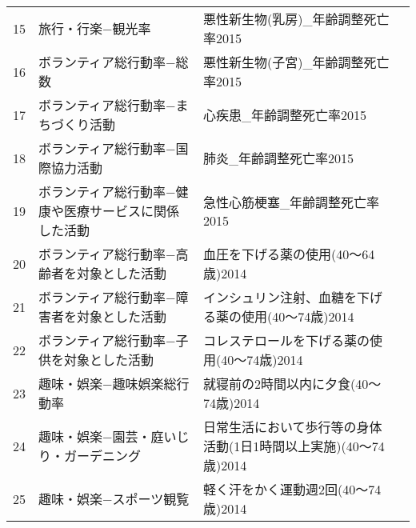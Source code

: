 \begin{table}[ht]
\begin{adjustbox}{width=1.5\textwidth}
\begin{tabular}{rlll}
  15 & 旅行・行楽−観光率 & 悪性新生物(乳房)\_年齢調整死亡率2015 &  \\
  16 & ボランティア総行動率−総数 & 悪性新生物(子宮)\_年齢調整死亡率2015 &  \\
  17 & ボランティア総行動率−まちづくり活動 & 心疾患\_年齢調整死亡率2015 &  \\
  18 & ボランティア総行動率−国際協力活動 & 肺炎\_年齢調整死亡率2015 &  \\
  19 & ボランティア総行動率−健康や医療サービスに関係した活動 & 急性心筋梗塞\_年齢調整死亡率2015 &  \\
  20 & ボランティア総行動率−高齢者を対象とした活動 & 血圧を下げる薬の使用(40〜64歳)2014 &  \\
  21 & ボランティア総行動率−障害者を対象とした活動 & インシュリン注射、血糖を下げる薬の使用(40〜74歳)2014 &  \\
  22 & ボランティア総行動率−子供を対象とした活動 & コレステロールを下げる薬の使用(40〜74歳)2014 &  \\
  23 & 趣味・娯楽−趣味娯楽総行動率 & 就寝前の2時間以内に夕食(40〜74歳)2014 &  \\
  24 & 趣味・娯楽−園芸・庭いじり・ガーデニング & 日常生活において歩行等の身体活動(1日1時間以上実施)(40〜74歳)2014 &  \\
  25 & 趣味・娯楽−スポーツ観覧 & 軽く汗をかく運動週2回(40〜74歳)2014 &  \\
   \hline
\end{tabular}
\end{adjustbox}

\endgroup
\end{table}

